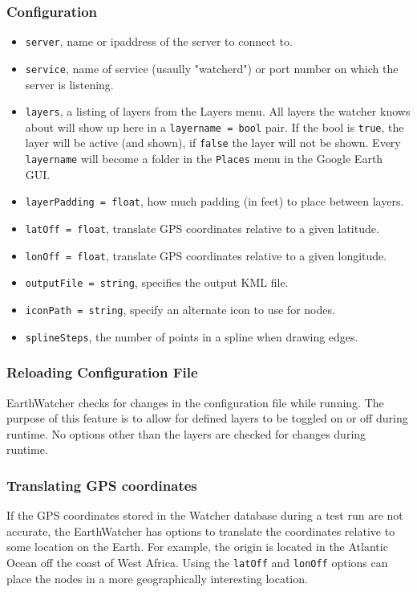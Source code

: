 \subsubsection{Configuration}
\begin{itemize}
\item {\tt server}, name or ipaddress of the server to connect to.
\item {\tt service}, name of service (usaully "watcherd") or port number on which the server is listening.
\item {\tt layers}, a listing of layers from the Layers menu. All layers the watcher knows about will show up here in a {\tt layername = bool} pair. 
If the bool is {\tt true}, the layer will be active (and shown), if {\tt false} the layer will not be shown. Every {\tt layername} will become
a folder in the {\tt Places} menu in the Google Earth GUI.
\item {\tt layerPadding = float}, how much padding (in feet) to place between layers. 
\item {\tt latOff = float}, translate GPS coordinates relative to a given latitude.
\item {\tt lonOff = float}, translate GPS coordinates relative to a given longitude.
\item {\tt outputFile = string}, specifies the output KML file.
\item {\tt iconPath = string}, specify an alternate icon to use for nodes.
\item {\tt splineSteps}, the number of points in a spline when drawing edges.
\end{itemize}

\subsubsection{Reloading Configuration File}

EarthWatcher checks for changes in the configuration file while running.  The purpose of this feature is to allow for
defined layers to be toggled on or off during runtime.  No options other than the layers are checked for changes during runtime.

\subsubsection{Translating GPS coordinates}

If the GPS coordinates stored in the Watcher database during a test run are not
accurate, the EarthWatcher has options to translate the coordinates relative to
some location on the Earth.  For example, the origin is located in the Atlantic
Ocean off the coast of West Africa.  Using the {\tt latOff} and {\tt lonOff}
options can place the nodes in a more geographically interesting location.
